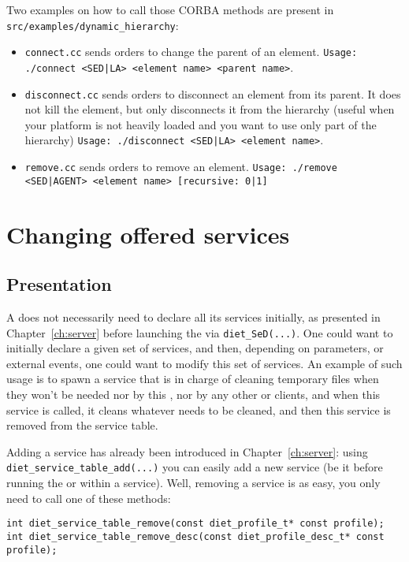 Two examples on how to call those CORBA methods are present in\newline
\texttt{src/examples/dynamic\_hierarchy}:
\begin{itemize}
\item \texttt{connect.cc} sends orders to change the parent of an element.\newline
%
    \texttt{Usage: ./connect <SED|LA> <element name> <parent name>}.

\item \texttt{disconnect.cc} sends orders to disconnect an element
  from its parent. It does not kill the element, but only disconnects
  it from the \diet hierarchy (useful when your platform is not
  heavily loaded and you want to use only part of the
  hierarchy)\newline
%
  \texttt{Usage: ./disconnect <SED|LA> <element name>}.

\item \texttt{remove.cc} sends orders to remove an element.\newline
%
    \texttt{Usage: ./remove <SED|AGENT> <element name> [recursive: 0|1]}
\end{itemize}


\section{Changing offered services}

\subsection{Presentation}
A \sed does not necessarily need to declare all its services
initially, \ie as presented in Chapter~\ref{ch:server} before
launching the \sed via \verb|diet_SeD(...)|. One could want to
initially declare a given set of services, and then, depending on
parameters, or external events, one could want to modify this set of
services. An example of such usage is to spawn a service that is in
charge of cleaning temporary files when they won't be needed nor by
this \sed, nor by any other \sed or clients, and when this service is
called, it cleans whatever needs to be cleaned, and then this service
is removed from the service table.

Adding a service has already been introduced in
Chapter~\ref{ch:server}: using \verb|diet_service_table_add(...)| you
can easily add a new service (be it before running the \sed or within
a service). Well, removing a service is as easy, you only need to call
one of these methods: {\footnotesize
\begin{verbatim}
int diet_service_table_remove(const diet_profile_t* const profile);
int diet_service_table_remove_desc(const diet_profile_desc_t* const profile);
\end{verbatim}
}


